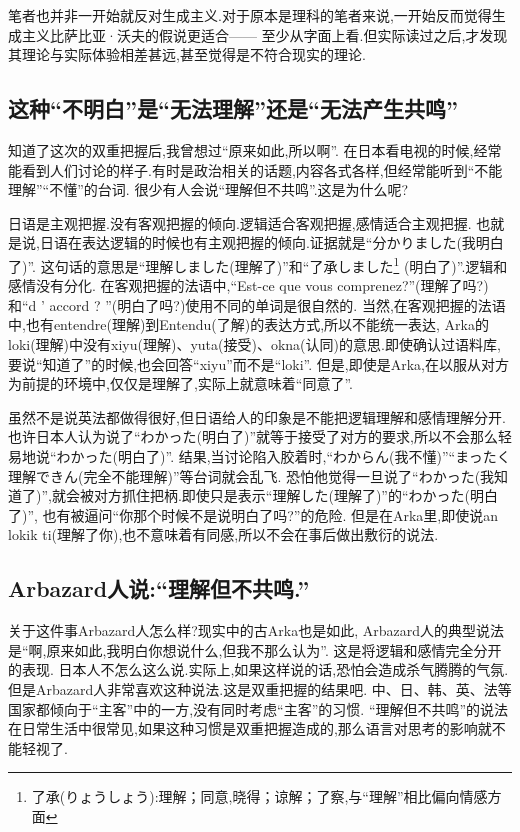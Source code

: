 笔者也并非一开始就反对生成主义.对于原本是理科的笔者来说,一开始反而觉得生成主义比萨比亚·沃夫的假说更适合——
至少从字面上看.但实际读过之后,才发现其理论与实际体验相差甚远,甚至觉得是不符合现实的理论.
\subsection{这种``不明白''是``无法理解''还是``无法产生共鸣''}

知道了这次的双重把握后,我曾想过“原来如此,所以啊”.
在日本看电视的时候,经常能看到人们讨论的样子.有时是政治相关的话题,内容各式各样,但经常能听到“不能理解”“不懂”的台词.
很少有人会说“理解但不共鸣”.这是为什么呢?

日语是主观把握.没有客观把握的倾向.逻辑适合客观把握,感情适合主观把握.
也就是说,日语在表达逻辑的时候也有主观把握的倾向.证据就是“分かりました(我明白了)”.
这句话的意思是“理解しました(理解了)”和“了承しました\footnote{了承(りょうしょう):理解；同意,晓得；谅解；了察,与``理解''相比偏向情感方面}
(明白了)”.逻辑和感情没有分化.
在客观把握的法语中,“Est-ce que vous comprenez?”(理解了吗?)和``d ' accord ? ''(明白了吗?)使用不同的单词是很自然的.
当然,在客观把握的法语中,也有entendre(理解)到Entendu(了解)的表达方式,所以不能统一表达,
Arka的loki(理解)中没有xiyu(理解)、yuta(接受)、okna(认同)的意思.即使确认过语料库,要说“知道了”的时候,也会回答“xiyu”而不是“loki”.
但是,即使是Arka,在以服从对方为前提的环境中,仅仅是理解了,实际上就意味着“同意了”.

虽然不是说英法都做得很好,但日语给人的印象是不能把逻辑理解和感情理解分开.
也许日本人认为说了“わかった(明白了)”就等于接受了对方的要求,所以不会那么轻易地说“わかった(明白了)”.
结果,当讨论陷入胶着时,“わからん(我不懂)”“まったく理解できん(完全不能理解)”等台词就会乱飞.
恐怕他觉得一旦说了“わかった(我知道了)”,就会被对方抓住把柄.即使只是表示“理解した(理解了)”的“わかった(明白了)”,
也有被逼问“你那个时候不是说明白了吗?”的危险.
但是在Arka里,即使说an lokik ti(理解了你),也不意味着有同感,所以不会在事后做出敷衍的说法.
\subsection{Arbazard人说:``理解但不共鸣.''}
关于这件事Arbazard人怎么样?现实中的古Arka也是如此,
Arbazard人的典型说法是“啊,原来如此,我明白你想说什么,但我不那么认为”.
这是将逻辑和感情完全分开的表现.
日本人不怎么这么说.实际上,如果这样说的话,恐怕会造成杀气腾腾的气氛.
但是Arbazard人非常喜欢这种说法.这是双重把握的结果吧.
中、日、韩、英、法等国家都倾向于“主客”中的一方,没有同时考虑“主客”的习惯.
“理解但不共鸣”的说法在日常生活中很常见,如果这种习惯是双重把握造成的,那么语言对思考的影响就不能轻视了.

